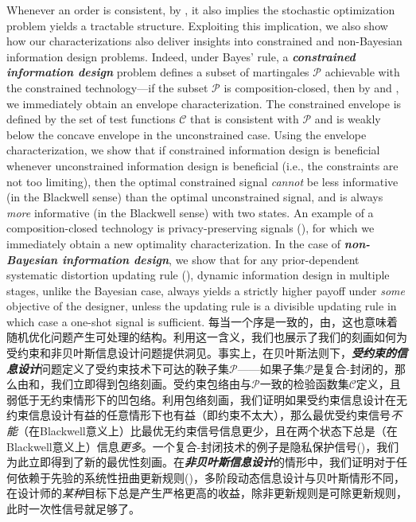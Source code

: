 \documentclass[12pt,letterpaper]{article}
\newenvironment{original}{\color{black}}{}
\newenvironment{translation}{\color{blue}}{}
\theoremstyle{plain}
\theoremstyle{definition}
\theoremstyle{remark}
\newcommand{\Pc}{\mathcal{P}}
\newcommand{\C}{\mathcal{C}}
\theoremstyle{definition}
\begin{document}
\begin{original}
Whenever an order is consistent, by , it also implies the stochastic optimization problem yields a tractable structure. Exploiting this implication, we also show how our characterizations also deliver insights into constrained and non-Bayesian information design problems. Indeed, under Bayes' rule, a \textit{\textbf{constrained information design}} problem defines a subset of martingales $\mathcal{P}$ achievable with the constrained technology---if the subset $\mathcal{P}$ is composition-closed, then by  and , we immediately obtain an envelope characterization. The constrained envelope is defined by the set of test functions $\C$ that is consistent with $\Pc$ and is weakly below the concave envelope in the unconstrained case. Using the envelope characterization, we show that if constrained information design is beneficial whenever unconstrained information design is beneficial (i.e., the constraints are not too limiting), then the optimal constrained signal \textit{cannot} be less informative (in the Blackwell sense) than the optimal unconstrained signal, and is always \textit{more} informative (in the Blackwell sense) with two states. An example of a composition-closed technology is privacy-preserving signals (\citealt{strack2024privacy}), for which we immediately obtain a new optimality characterization.  In the case of \textit{\textbf{non-Bayesian information design}}, we show that for any prior-dependent systematic distortion updating rule (\citealt{de2022non}), dynamic information design in multiple stages, unlike the Bayesian case, always yields a strictly higher payoff under \textit{some} objective of the designer, unless the updating rule is a divisible updating rule in which case a one-shot signal is sufficient.
\end{original}
\begin{translation}
每当一个序是一致的，由，这也意味着随机优化问题产生可处理的结构。利用这一含义，我们也展示了我们的刻画如何为受约束和非贝叶斯信息设计问题提供洞见。事实上，在贝叶斯法则下，\textit{\textbf{受约束的信息设计}}问题定义了受约束技术下可达的鞅子集$\mathcal{P}$——如果子集$\mathcal{P}$是复合-封闭的，那么由和，我们立即得到包络刻画。受约束包络由与$\Pc$一致的检验函数集$\C$定义，且弱低于无约束情形下的凹包络。利用包络刻画，我们证明如果受约束信息设计在无约束信息设计有益的任意情形下也有益（即约束不太大），那么最优受约束信号\textit{不能}（在Blackwell意义上）比最优无约束信号信息更少，且在两个状态下总是（在Blackwell意义上）信息\textit{更多}。一个复合-封闭技术的例子是隐私保护信号(\citealt{strack2024privacy})，我们为此立即得到了新的最优性刻画。在\textit{\textbf{非贝叶斯信息设计}}的情形中，我们证明对于任何依赖于先验的系统性扭曲更新规则(\citealt{de2022non})，多阶段动态信息设计与贝叶斯情形不同，在设计师的\textit{某种}目标下总是产生严格更高的收益，除非更新规则是可除更新规则，此时一次性信号就足够了。
\end{translation}
\end{document}

